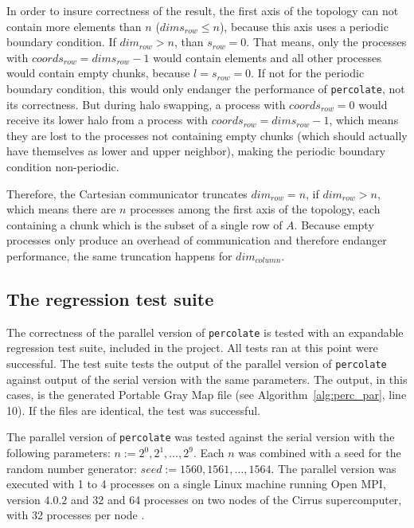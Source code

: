 \documentclass[twoside,11pt]{article}
\def\perc{\texttt{perco\-late}}
\begin{document}
In order to insure correctness of the result, the first
axis of the topology can not contain more elements than $n$
($dims_{row} \leq n$), because this axis uses a periodic
boundary condition.
If $dim_{row} > n$, than $s_{row} = 0$. That means, only
the processes with $coords_{row} = dims_{row} - 1$ would
contain elements and all other processes would contain
empty chunks, because $l = s_{row} = 0$.
If not for the periodic boundary condition, this would only
endanger the performance of \perc{}, not its correctness.
But during halo swapping, a process with $coords_{row} = 0$
would receive its lower halo from a process with
$coords_{row} = dims_{row} - 1$, which means they are
lost to the processes not containing empty chunks
(which should actually have themselves as lower and upper
neighbor), making the periodic boundary condition
non-periodic.

Therefore, the Cartesian communicator truncates
$dim_{row} = n$, if $dim_{row} > n$, which means there are
$n$ processes among the first axis of the topology, each
containing a chunk which is the subset of a single row of
$A$.
Because empty processes only produce an overhead of
communication and therefore endanger performance, the same
truncation happens for $dim_{column}$.



\subsection{The regression test suite}

The correctness of the parallel version of \perc{} is
tested with an expandable regression test suite, included
in the project.
All tests ran at this point were successful.
The test suite tests the output of the parallel version of
\perc{} against output of the serial version with the same
parameters.
The output, in this cases, is the generated Portable Gray
Map file (see Algorithm~\ref{alg:perc_par}, line 10).
If the files are identical, the test was successful.

The parallel version of \perc{} was tested against the
serial version with the following parameters:
$n := 2^0, 2^1,\dots,2^9$.
Each $n$ was combined with a seed for the random number
generator: $seed := 1560, 1561,\dots, 1564$.
The parallel version was executed with 1 to 4 processes on
a single Linux machine running Open MPI, version $4.0.2$
and 32 and 64 processes on two nodes of the Cirrus
supercomputer, with 32 processes per node \citep[see][]
{openmpi, cirrus}.
\end{document}
